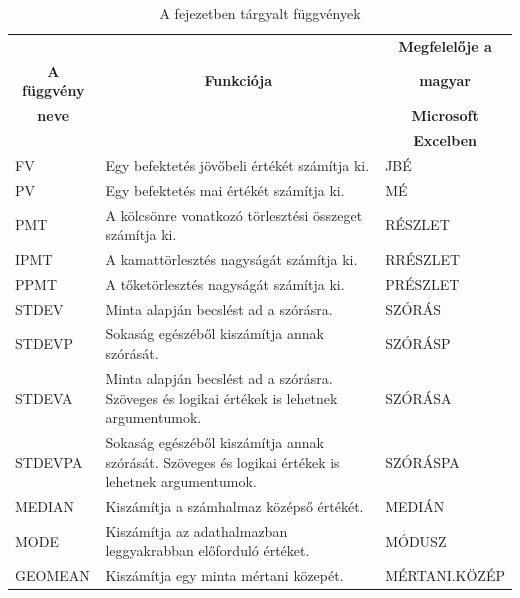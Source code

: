 \begin{table}[!h]
\begin{center}
\caption{A fejezetben tárgyalt függvények}\label{15-fejezetFüggvények}
\begin{tabular}{|m{3cm}|m{8cm}|m{3.5cm}|}
\hline
 & & \multicolumn{1}{c|}{\textbf{Megfelelője a}} \\
\multicolumn{1}{|c|}{\textbf{A függvény}}&
\multicolumn{1}{c|}{\textbf{Funkciója}}&
\multicolumn{1}{c|}{\textbf{magyar}} \\
\multicolumn{1}{|c|}{\textbf{neve}} & &
\multicolumn{1}{c|}{\textbf{Microsoft}} \\
 & & \multicolumn{1}{c|}{\textbf{Excelben}} \\
\hline
FV & Egy befektetés jövőbeli értékét számítja ki. & JBÉ\\ \hline
PV & Egy befektetés mai értékét számítja ki. & MÉ\\ \hline
PMT & A kölcsönre vonatkozó törlesztési összeget számítja ki. &
RÉSZLET\\ \hline
IPMT & A kamattörlesztés nagyságát számítja ki. & RRÉSZLET\\ \hline
PPMT & A tőketörlesztés nagyságát számítja ki. & PRÉSZLET\\ \hline
STDEV & Minta alapján becslést ad a szórásra. & SZÓRÁS\\ \hline
STDEVP & Sokaság egészéből kiszámítja annak szórását. & SZÓRÁSP\\ \hline
STDEVA & Minta alapján becslést ad a szórásra. Szöveges és logikai
értékek is lehetnek argumentumok. & SZÓRÁSA\\ \hline
STDEVPA & Sokaság egészéből kiszámítja annak szórását.
Szöveges és logikai értékek is lehetnek argumentumok. & SZÓRÁSPA\\ \hline
MEDIAN & Kiszámítja a számhalmaz középső értékét. & MEDIÁN\\ \hline
MODE & Kiszámítja az adathalmazban leggyakrabban előforduló
értéket. & MÓDUSZ\\ \hline
GEOMEAN & Kiszámítja egy minta mértani közepét. & MÉRTANI.KÖZÉP\\ \hline
\end{tabular}
\end{center}
\end{table}

